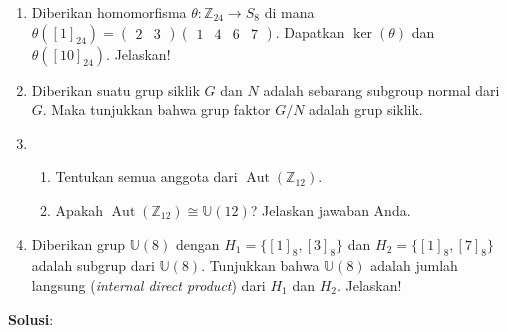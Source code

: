\documentclass[10pt,openany,a4paper]{article}
\newcommand{\jawab}{\textbf{Solusi}:}
\begin{document}
\begin{enumerate}
    \item Diberikan homomorfisma $\theta: \mathbb{Z}_{24} \to S_8$ di mana $\theta([1]_{24}) = \begin{pmatrix}2&3\end{pmatrix}\begin{pmatrix}1&4&6&7\end{pmatrix}$. Dapatkan $\ker(\theta)$ dan $\theta([10]_{24})$. Jelaskan!
    
    \item Diberikan suatu grup siklik $G$ dan $N$ adalah sebarang subgroup normal dari $G$. Maka tunjukkan bahwa grup faktor $G / N$ adalah grup siklik.
    
    \item 
    \begin{enumerate}
        \item Tentukan semua anggota dari $\operatorname{Aut}(\mathbb{Z}_{12})$.
        \item Apakah $\operatorname{Aut}(\mathbb{Z}_{12}) \cong \mathbb{U}(12)$? Jelaskan jawaban Anda.
    \end{enumerate}
    
    \item Diberikan grup $\mathbb{U}(8)$ dengan $H_1 = \{[1]_8, [3]_8\}$ dan $H_2 = \{[1]_8, [7]_8\}$ adalah subgrup dari $\mathbb{U}(8)$. Tunjukkan bahwa $\mathbb{U}(8)$ adalah jumlah langsung (\textit{internal direct product}) dari $H_1$ dan $H_2$. Jelaskan!
\end{enumerate}
\jawab
\end{document}
